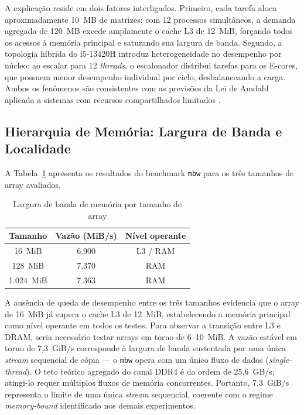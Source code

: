 \documentclass[12pt]{article}
\begin{document}
A explicação reside em dois fatores interligados. Primeiro, cada tarefa aloca aproximadamente 10~MB de matrizes; com 12 processos simultâneos, a demanda agregada de 120~MB excede amplamente o cache L3 de 12~MiB, forçando todos os acessos à memória principal e saturando sua largura de banda. Segundo, a topologia híbrida do i5-13420H introduz heterogeneidade no desempenho por núcleo: ao escalar para 12 \textit{threads}, o escalonador distribui tarefas para os E-cores, que possuem menor desempenho individual por ciclo, desbalanceando a carga. Ambos os fenômenos são consistentes com as previsões da Lei de Amdahl aplicada a sistemas com recursos compartilhados limitados \cite{amdahl1967}.

\subsection{Hierarquia de Memória: Largura de Banda e Localidade}

A Tabela~\ref{tab:mbw} apresenta os resultados do benchmark \texttt{mbw} para os três tamanhos de array avaliados.

\begin{table}[H]
\centering
\caption{Largura de banda de memória por tamanho de array}
\label{tab:mbw}
\begin{tabular}{ccc}
\hline
\textbf{Tamanho} & \textbf{Vazão (MiB/s)} & \textbf{Nível operante} \\
\hline
16~MiB    & 6.900 & L3 / RAM \\
128~MiB   & 7.370 & RAM      \\
1.024~MiB & 7.363 & RAM      \\
\hline
\end{tabular}
\end{table}

A ausência de queda de desempenho entre os três tamanhos evidencia que o array de 16~MiB já supera o cache L3 de 12~MiB, estabelecendo a memória principal como nível operante em todos os testes. Para observar a transição entre L3 e DRAM, seria necessário testar arrays em torno de 6--10~MiB. A vazão estável em torno de 7,3~GiB/s corresponde à largura de banda sustentada por uma única \textit{stream} sequencial de cópia --- o \texttt{mbw} opera com um único fluxo de dados (\textit{single-thread}). O teto teórico agregado do canal DDR4 é da ordem de 25,6~GB/s; atingi-lo requer múltiplos fluxos de memória concorrentes. Portanto, 7,3~GiB/s representa o limite de uma única \textit{stream} sequencial, coerente com o regime \textit{memory-bound} identificado nos demais experimentos.
\end{document}
